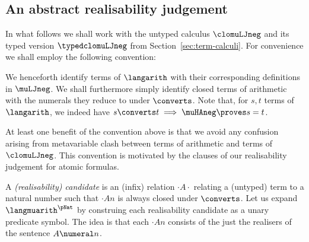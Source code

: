 \subsection{An abstract realisability judgement}
In what follows we shall work with the untyped calculus $\clomuLJneg$ and its typed version $\typedclomuLJneg$ from Section~\ref{sec:term-calculi}.
For convenience we shall employ the following convention:
\begin{convention}
We henceforth identify terms of $\langarith$ with their corresponding definitions in $\muLJneg$. 
We shall furthermore simply identify closed terms of arithmetic with the numerals they reduce to under $\converts$.
Note that, for $s,t$ terms of $\langarith$, we indeed have $s\converts t \implies \muHAneg \proves s=t$.
\end{convention}
At least one benefit of the convention above
is that we avoid any confusion arising from metavariable clash between terms of arithmetic and terms of $\clomuLJneg$. 
This convention is motivated by the clauses of our realisability judgement for atomic formulas.


\medskip



A \emph{(realisability) candidate} is an (infix) relation $\cdot A \cdot $ relating a (untyped) term to a natural number such that $\cdot A n$ is always closed under $\converts$. 
Let us expand $\langmuarith^\pNat $ by construing each realisability candidate as a unary predicate symbol.
The idea is that each $\cdot An $ consists of the just the realisers of the sentence $A\numeral n$.



